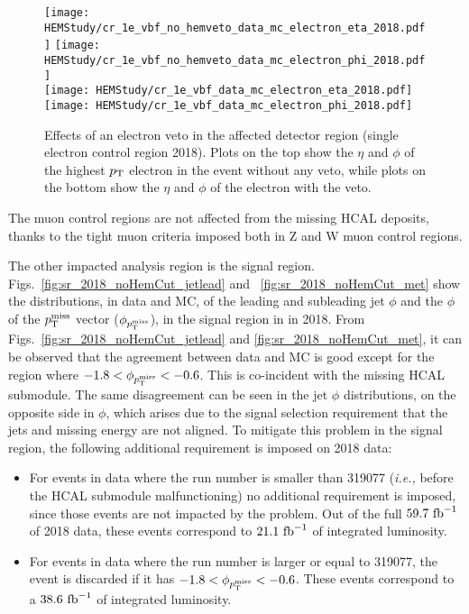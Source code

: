 \begin{figure}[htbp]
    \begin{center}
        \texttt{[image: HEMStudy/cr\_1e\_vbf\_no\_hemveto\_data\_mc\_electron\_eta\_2018.pdf]}
        \texttt{[image: HEMStudy/cr\_1e\_vbf\_no\_hemveto\_data\_mc\_electron\_phi\_2018.pdf]} \\
        \texttt{[image: HEMStudy/cr\_1e\_vbf\_data\_mc\_electron\_eta\_2018.pdf]}
        \texttt{[image: HEMStudy/cr\_1e\_vbf\_data\_mc\_electron\_phi\_2018.pdf]}
    \end{center}
    \caption{Effects of an electron veto in the affected detector region (single electron control region 2018). 
    Plots on the top show the $\eta$ and $\phi$ of the highest $p_{\textrm{T}}$ electron in the event
    without any veto, while plots on the bottom show the $\eta$ and $\phi$ of the electron with the veto.}
    \label{fig:HEM_motivation}
\end{figure}

The muon control regions are not affected from the missing HCAL deposits, 
thanks to the tight muon criteria imposed both in Z and W muon control regions.

The other impacted analysis region is the signal region. 
Figs.~\ref{fig:sr_2018_noHemCut_jetlead} and ~\ref{fig:sr_2018_noHemCut_met} show the distributions, in data and MC, of the leading and subleading 
jet $\phi$ and the $\phi$ of the $p_{\textrm{T}}^{\textrm{miss}}$ vector ($\phi_{p_{\textrm{T}}^{\textrm{miss}}}$), in the signal region in in 2018. 
From Figs.~\ref{fig:sr_2018_noHemCut_jetlead} and \ref{fig:sr_2018_noHemCut_met}, it can be observed that the agreement between data and MC is good 
except for the region where $-1.8 < \phi_{p_{\textrm{T}}^{\textrm{miss}}} < -0.6$. This is co-incident 
with the missing HCAL submodule. The same disagreement can be seen in the jet $\phi$ distributions, on the opposite side in $\phi$, 
which arises due to the signal selection requirement that the jets and missing energy are not aligned.
To mitigate this problem in the signal region, the following additional requirement is imposed on 2018 data:

\begin{itemize}
    \item For events in data where the run number is smaller than 319077 (\textit{i.e.,} before the HCAL submodule malfunctioning)
    no additional requirement is imposed, since those events are not impacted by the problem. Out of the full $59.7 \ \fbinv$
    of 2018 data, these events correspond to $21.1 \ \textrm{fb}^{-1}$ of integrated luminosity.
    \item For events in data where the run number is larger or equal to 319077, the event is discarded
    if it has $-1.8 < \phi_{p_{\textrm{T}}^{\textrm{miss}}} < -0.6$. These events correspond to a $38.6 \ \textrm{fb}^{-1}$ of integrated luminosity. 
\end{itemize}

